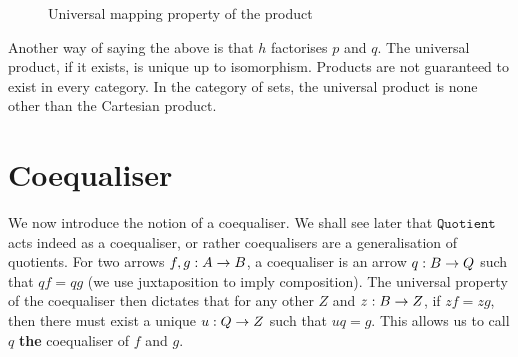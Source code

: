 \documentclass[12pt,twoside,maitrise]{dms}
\theoremstyle{definition}
\numberwithin{equation}{section}
\numberwithin{table}{chapter}
\numberwithin{figure}{chapter}
\newcommand\id[1] {\texttt{#1}}
\begin{document}
\begin{figure}

\caption{Universal mapping property of the product}\label{fig:ump-product}

\end{figure}

Another way of saying the above is that $h$ factorises $p$ and $q$. The
universal product, if it exists, is unique up to isomorphism. Products are not
guaranteed to exist in every category. In the category of sets, the universal
product is none other than the Cartesian product.

\section{Coequaliser}\label{sec:coequaliser}
We now introduce the notion of a coequaliser. We shall see later that
$\id{Quotient}$ acts indeed as a coequaliser, or rather coequalisers are a
generalisation of quotients. For two arrows $\oftype{f, g}{A \rightarrow B}$, a
coequaliser is an arrow $\oftype{q}{B \rightarrow Q}$ such that $qf = qg$ (we
use juxtaposition to imply composition). The universal property of the
coequaliser then dictates that for any other $Z$ and $\oftype{z}{B \rightarrow
  Z}$, if $zf = zg$, then there must exist a unique $\oftype{u}{Q \rightarrow
  Z}$ such that $uq = g$. This allows us to call $q$ \textbf{the} coequaliser of
$f$ and $g$.
\end{document}
